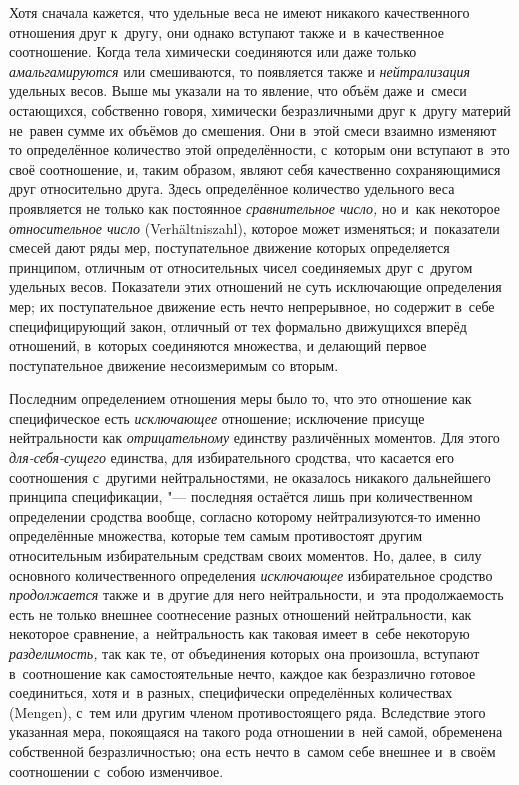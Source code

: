 Хотя сначала кажется, что удельные веса не имеют никакого качественного
отношения друг к~другу, они однако вступают также и~в качественное соотношение.
Когда тела химически соединяются или даже только {\em амальгамируются} или
смешиваются, то появляется также и {\em нейтрализация} удельных весов. Выше
мы указали на то явление, что объём даже и~смеси остающихся, собственно говоря,
химически безразличными друг к~другу материй не~равен сумме их объёмов до
смешения. Они в~этой смеси взаимно изменяют то определённое количество этой
определённости, с~которым они вступают в~это своё соотношение, и, таким
образом, являют себя качественно сохраняющимися друг относительно друга. Здесь
определённое количество удельного веса проявляется не только как постоянное
{\em сравнительное число,} но и~как некоторое {\em относительное число}
(Ver\-hält\-nis\-zahl), которое может изменяться; и~показатели смесей дают ряды
мер, поступательное движение которых определяется принципом, отличным от
относительных чисел соединяемых друг с~другом удельных весов. Показатели
этих отношений не суть исключающие определения мер; их поступательное движение
есть нечто непрерывное, но содержит в~себе специфицирующий закон, отличный от
тех формально движущихся вперёд отношений, в~которых соединяются множества, и
делающий первое поступательное движение несоизмеримым со вторым.


Последним определением отношения меры было то, что это отношение как специфическое есть
{\em исключающее} отношение; исключение присуще нейтральности как {\em отрицательному}
единству различённых моментов. Для этого {\em для-себя-сущего} единства, для
избирательного сродства, что касается его соотношения с~другими
нейтральностями, не оказалось никакого дальнейшего принципа спецификации, "---
последняя остаётся лишь при количественном определении сродства вообще,
согласно которому нейтрализуются-то именно определённые множества, которые тем
самым противостоят другим относительным избирательным средствам своих моментов.
Но, далее, в~силу основного количественного определения {\em исключающее}
избирательное сродство {\em продолжается} также и~в другие для него
нейтральности, и~эта продолжаемость есть не только внешнее соотнесение разных
отношений нейтральности, как некоторое сравнение, а~нейтральность как таковая
имеет в~себе некоторую {\em разделимость,} так как те, от объединения которых
она произошла, вступают в~соотношение как самостоятельные нечто, каждое как
безразлично готовое соединиться, хотя и~в разных, специфически определённых
количествах (Mengen), с~тем или другим членом противостоящего ряда. Вследствие этого
указанная мера, покоящаяся на такого рода отношении в~ней самой, обременена
собственной безразличностью; она есть нечто в~самом себе внешнее и~в своём
соотношении с~собою изменчивое.

